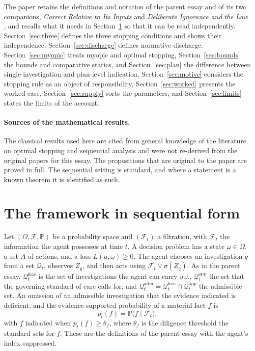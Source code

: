 \documentclass[11pt]{article}
\newcommand{\F}{\mathcal F}
\newcommand{\Q}{\mathcal Q}
\newcommand{\PP}{\mathbb P}
\newcommand{\feas}{\mathrm{feas}}
\newcommand{\adm}{\mathrm{adm}}
\newcommand{\app}{\mathrm{app}}
\theoremstyle{plain}
\theoremstyle{definition}
\begin{document}
The paper retains the definitions and notation of the parent essay and of its two companions, \emph{Correct Relative to Its Inputs} \cite{flyxion2026inputs} and \emph{Deliberate Ignorance and the Law} \cite{flyxion2026law}, and recalls what it needs in Section~\ref{sec:framework} so that it can be read independently. Section~\ref{sec:three} defines the three stopping conditions and shows their independence. Section~\ref{sec:discharge} defines normative discharge. Section~\ref{sec:myopic} treats myopic and optimal stopping, Section~\ref{sec:bounds} the bounds and comparative statics, and Section~\ref{sec:plan} the difference between single-investigation and plan-level indication. Section~\ref{sec:motive} considers the stopping rule as an object of responsibility, Section~\ref{sec:worked} presents the worked case, Section~\ref{sec:supply} sorts the parameters, and Section~\ref{sec:limits} states the limits of the account.

\paragraph{Sources of the mathematical results.} The classical results used here are cited from general knowledge of the literature on optimal stopping and sequential analysis and were not re-derived from the original papers for this essay. The propositions that are original to the paper are proved in full. The sequential setting is standard, and where a statement is a known theorem it is identified as such.

\section{The framework in sequential form}\label{sec:framework}

Let $(\Omega,\F,\PP)$ be a probability space and $(\F_t)$ a filtration, with $\F_t$ the information the agent possesses at time $t$. A decision problem has a state $\omega\in\Omega$, a set $A$ of actions, and a loss $L(a,\omega)\ge 0$. The agent chooses an investigation $q$ from a set $\Q_t$, observes $Z_q$, and then acts using $\F_t\vee\sigma(Z_q)$. As in the parent essay, $\Q_t^{\feas}$ is the set of investigations the agent can carry out, $\Q_t^{\app}$ the set that the governing standard of care calls for, and $\Q_t^{\adm}=\Q_t^{\feas}\cap\Q_t^{\app}$ the admissible set. An omission of an admissible investigation that the evidence indicated is deficient, and the evidence-supported probability of a material fact $f$ is
\[
p_t(f)=\PP\bigl(f\mid \F_t\bigr),
\]
with $f$ indicated when $p_t(f)\ge\theta_f$, where $\theta_f$ is the diligence threshold the standard sets for $f$. These are the definitions of the parent essay with the agent's index suppressed.
\end{document}
